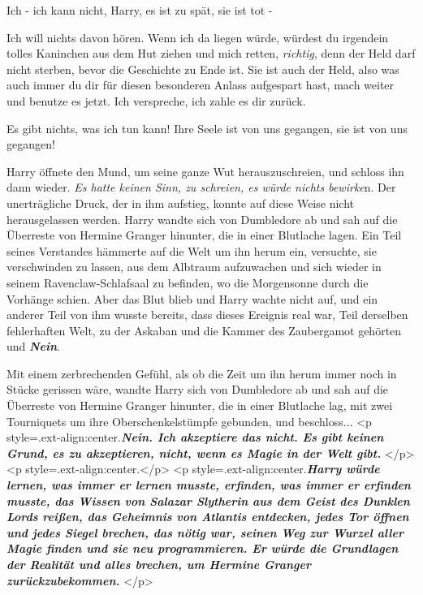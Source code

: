 \glqq{}Ich - ich kann nicht, Harry, es ist zu spät, sie ist tot -\grqq{}

\glqq{}Ich will nichts davon hören. Wenn ich da liegen würde, würdest du
irgendein tolles Kaninchen aus dem Hut ziehen und mich retten, \emph{richtig},
denn der Held darf nicht sterben, bevor die Geschichte zu Ende ist. Sie ist auch
der Held, also was auch immer du dir für diesen besonderen Anlass aufgespart
hast, mach weiter und benutze es jetzt. Ich verspreche, ich zahle es dir
zurück.\grqq{}

\glqq{}Es gibt nichts, was ich tun kann! Ihre Seele ist von uns gegangen, sie ist
von uns gegangen!\grqq{}

Harry öffnete den Mund, um seine ganze Wut herauszuschreien, und schloss ihn
dann wieder. \emph{Es hatte keinen Sinn, zu schreien, es würde nichts bewirke}n.
Der unerträgliche Druck, der in ihm aufstieg, konnte auf diese Weise nicht
herausgelassen werden. Harry wandte sich von Dumbledore ab und sah auf die
Überreste von Hermine Granger hinunter, die in einer Blutlache lagen. Ein Teil
seines Verstandes hämmerte auf die Welt um ihn herum ein, versuchte, sie
verschwinden zu lassen, aus dem Albtraum aufzuwachen und sich wieder in seinem
Ravenclaw-Schlafsaal zu befinden, wo die Morgensonne durch die Vorhänge schien.
Aber das Blut blieb und Harry wachte nicht auf, und ein anderer Teil von ihm
wusste bereits, dass dieses Ereignis real war, Teil derselben fehlerhaften Welt,
zu der Askaban und die Kammer des Zaubergamot gehörten und \textbf{\emph{Nein}}.

Mit einem zerbrechenden Gefühl, als ob die Zeit um ihn herum immer noch in
Stücke gerissen wäre, wandte Harry sich von Dumbledore ab und sah auf die
Überreste von Hermine Granger hinunter, die in einer Blutlache lag, mit zwei
Tourniquets um ihre Oberschenkelstümpfe gebunden, und beschloss...
\textbf{}
<p style=\grqq{}.ext-align:center\grqq{}.\textbf{\emph{Nein. Ich akzeptiere das
nicht. Es gibt keinen Grund, es zu akzeptieren, nicht, wenn es Magie in der Welt
gibt.}} </p> <p style=\grqq{}.ext-align:center\grqq{}.\textbf{}</p> <p
style=\grqq{}.ext-align:center\grqq{}.\textbf{\emph{Harry würde lernen, was
immer er lernen musste, erfinden, was immer er erfinden musste, das Wissen von
Salazar Slytherin aus dem Geist des Dunklen Lords reißen, das Geheimnis von
Atlantis entdecken, jedes Tor öffnen und jedes Siegel brechen, das nötig war,
seinen Weg zur Wurzel aller Magie finden und sie neu programmieren. Er würde die
Grundlagen der Realität und alles brechen, um Hermine Granger
zurückzubekommen.}} </p>

